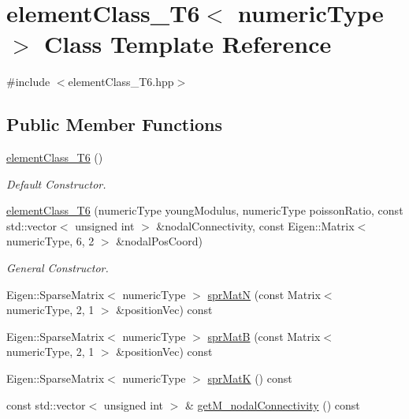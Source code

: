 \hypertarget{classelement_class___t6}{}\section{element\+Class\+\_\+\+T6$<$ numeric\+Type $>$ Class Template Reference}
\label{classelement_class___t6}


{\ttfamily \#include $<$element\+Class\+\_\+\+T6.\+hpp$>$}

\subsection*{Public Member Functions}
\begin{DoxyCompactItemize}
\item 
\mbox{\label{classelement_class___t6_ae5cf7beb6805a64e843bde5b86411ba1}} 
\mbox{\hyperlink{classelement_class___t6_ae5cf7beb6805a64e843bde5b86411ba1}{element\+Class\+\_\+\+T6}} ()
\begin{DoxyCompactList}\small\item\em Default Constructor. \end{DoxyCompactList}\item 
\mbox{\label{classelement_class___t6_ac18008e975c7da2a42eb2b952c335faf}} 
\mbox{\hyperlink{classelement_class___t6_ac18008e975c7da2a42eb2b952c335faf}{element\+Class\+\_\+\+T6}} (numeric\+Type young\+Modulus, numeric\+Type poisson\+Ratio, const std\+::vector$<$ unsigned int $>$ \&nodal\+Connectivity, const Eigen\+::\+Matrix$<$ numeric\+Type, 6, 2 $>$ \&nodal\+Pos\+Coord)
\begin{DoxyCompactList}\small\item\em General Constructor. \end{DoxyCompactList}\item 
Eigen\+::\+Sparse\+Matrix$<$ numeric\+Type $>$ \mbox{\hyperlink{classelement_class___t6_ad8f57028dfbb4215979ef16b88d65957}{spr\+MatN}} (const Matrix$<$ numeric\+Type, 2, 1 $>$ \&position\+Vec) const
\item 
Eigen\+::\+Sparse\+Matrix$<$ numeric\+Type $>$ \mbox{\hyperlink{classelement_class___t6_a03adb5b9a48edd11f48d1749e388ab40}{spr\+MatB}} (const Matrix$<$ numeric\+Type, 2, 1 $>$ \&position\+Vec) const
\item 
Eigen\+::\+Sparse\+Matrix$<$ numeric\+Type $>$ \mbox{\hyperlink{classelement_class___t6_a7f9d1575134a4afe28a5505ce4e6de4d}{spr\+MatK}} () const
\item 
const std\+::vector$<$ unsigned int $>$ \& \mbox{\hyperlink{classelement_class___t6_aee26f002dd5cc8d34f03e7ef008a7208}{get\+M\+\_\+nodal\+Connectivity}} () const
\end{DoxyCompactItemize}


